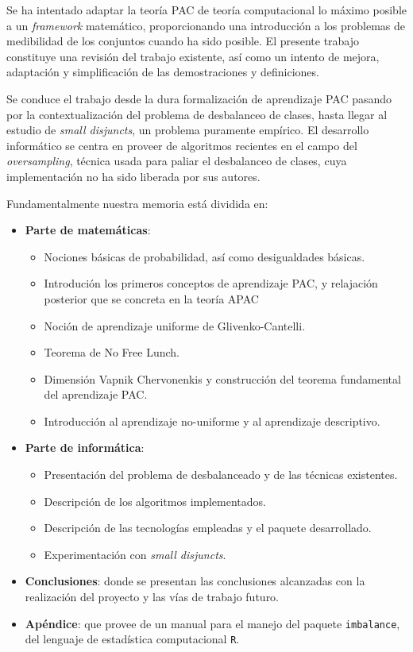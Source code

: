 Se ha intentado adaptar la teoría PAC de teoría computacional lo máximo posible a un \textit{framework} matemático, proporcionando
una introducción a los problemas de medibilidad de los conjuntos cuando ha sido posible. El presente trabajo constituye una
revisión del trabajo existente, así como un intento de mejora, adaptación y simplificación de las demostraciones y definiciones.

Se conduce el trabajo desde la dura formalización de aprendizaje PAC pasando por la contextualización del problema de 
desbalanceo de clases, hasta llegar al estudio de \textit{small disjuncts}, un problema puramente empírico. El desarrollo
informático se centra en proveer de algoritmos recientes en el campo del \textit{oversampling}, técnica usada para paliar
el desbalanceo de clases, cuya implementación no ha sido liberada por sus autores.

Fundamentalmente nuestra memoria está dividida en:
\begin{itemize}
\item \textbf{Parte de matemáticas}:
 \begin{itemize}
  \item Nociones básicas de probabilidad, así como desigualdades básicas.
  \item Introdución los primeros conceptos de aprendizaje PAC, y relajación posterior que se concreta en la teoría APAC
  \item Noción de aprendizaje uniforme de Glivenko-Cantelli.
  \item Teorema de No Free Lunch.
  \item Dimensión Vapnik Chervonenkis y construcción del teorema fundamental del aprendizaje PAC.
  \item Introducción al aprendizaje no-uniforme y al aprendizaje descriptivo.
 \end{itemize}
\item \textbf{Parte de informática}:
 \begin{itemize}
  \item Presentación del problema de desbalanceado y de las técnicas existentes.
  \item Descripción de los algoritmos implementados.
  \item Descripción de las tecnologías empleadas y el paquete desarrollado.
  \item Experimentación con \textit{small disjuncts}.
 \end{itemize}
\item \textbf{Conclusiones}: donde se presentan las conclusiones alcanzadas con la realización del proyecto y las vías de 
 trabajo futuro.
\item \textbf{Apéndice}: que provee de un manual para el manejo del paquete \texttt{imbalance}, del lenguaje de estadística
computacional \texttt{R}.
\end{itemize}


